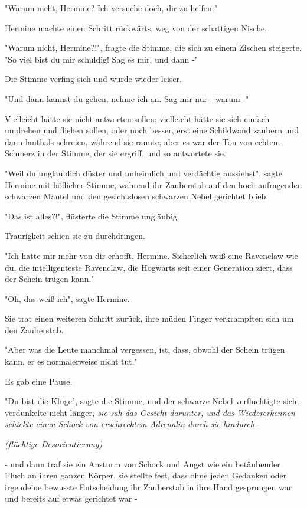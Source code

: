 {"Warum nicht, Hermine? Ich versuche doch, dir zu helfen."

Hermine machte einen Schritt rückwärts, weg von der schattigen Nische.

"Warum nicht, Hermine?!", fragte die Stimme, die sich zu einem Zischen steigerte. "So viel bist du mir schuldig! Sag es mir, und dann -"

Die Stimme verfing sich und wurde wieder leiser.

"Und dann kannst du gehen, nehme ich an. Sag mir nur - warum -"

Vielleicht hätte sie nicht antworten sollen; vielleicht hätte sie sich einfach umdrehen und fliehen sollen, oder noch besser, erst eine Schildwand zaubern und dann lauthals schreien, während sie rannte; aber es war der Ton von echtem Schmerz in der Stimme, der sie ergriff, und so antwortete sie.

"Weil du unglaublich düster und unheimlich und verdächtig aussiehst", sagte Hermine mit höflicher Stimme, während ihr Zauberstab auf den hoch aufragenden schwarzen Mantel und den gesichtslosen schwarzen Nebel gerichtet blieb.

"Das ist alles?!", flüsterte die Stimme ungläubig.

Traurigkeit schien sie zu durchdringen.

"Ich hatte mir mehr von dir erhofft, Hermine. Sicherlich weiß eine Ravenclaw wie du, die intelligenteste Ravenclaw, die Hogwarts seit einer Generation ziert, dass der Schein trügen kann."

"Oh, das weiß ich", sagte Hermine.

Sie trat einen weiteren Schritt zurück, ihre müden Finger verkrampften sich um den Zauberstab.

"Aber was die Leute manchmal vergessen, ist, dass, obwohl der Schein trügen kann, er es normalerweise nicht tut."

Es gab eine Pause.

"Du bist die Kluge", sagte die Stimme, und der schwarze Nebel verflüchtigte sich, verdunkelte nicht länger\emph{; sie sah das Gesicht darunter, und das Wiedererkennen schickte einen Schock von erschrecktem Adrenalin durch sie hindurch} -

\emph{(flüchtige Desorientierung)}

\emph{\hfill\break } - und dann traf sie ein Ansturm von Schock und Angst wie ein betäubender Fluch an ihren ganzen Körper, sie stellte fest, dass ohne jeden Gedanken oder irgendeine bewusste Entscheidung ihr Zauberstab in ihre Hand gesprungen war und bereits auf etwas gerichtet war -

}
